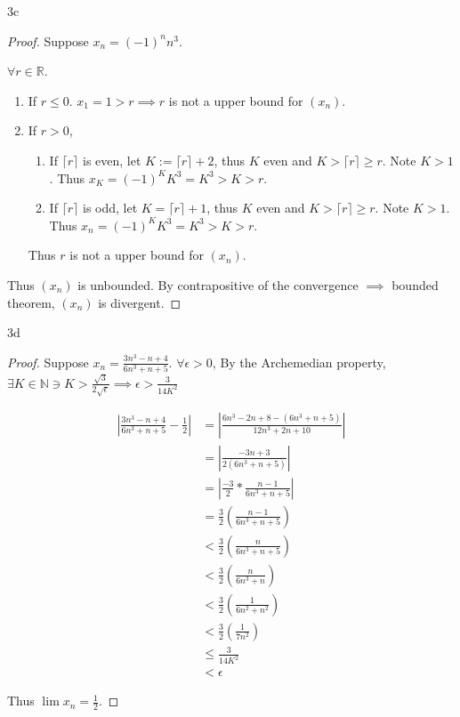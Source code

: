 \documentclass{article}
\newcommand{\R}{\mathbb{R}}
\newcommand{\N}{\mathbb{N}}
\newcommand{\abs}[1]{\left\lvert #1\right\rvert}
\newcommand{\ceil}[1]{\lceil{#1}\rceil}
\begin{document}
\begin{PROB}{3c}\label{Problem 3c.}
\end{PROB}
\begin{proof}
    Suppose $x_n = (-1)^n n^3$. 

    $\forall r \in \R$. 
    
    \begin{enumerate}
        \item If $r \leq 0$. $x_1 = 1 > r \implies r$ is not a upper bound for $(x_n)$.
        \item If $r > 0$, 
        \begin{enumerate}
            \item If $\ceil{r}$ is even, let $K := \ceil{r} + 2$, thus $K$ even and $K > \ceil{r} \geq r$. Note $K > 1$. Thus $x_K = (-1)^K K^3 = K^3 > K > r$.
            \item If $\ceil{r}$ is odd, let $K = \ceil{r} + 1$, thus $K$ even and $K > \ceil{r} \geq r$. Note $K > 1$. Thus $x_n = (-1)^K K^3 = K^3 > K>r$.      
        \end{enumerate}

        Thus $r$ is not a upper bound for $(x_n)$.   
    \end{enumerate}

    Thus $(x_n)$ is unbounded. By contrapositive of the convergence $\implies$ bounded theorem, $(x_n)$ is divergent.
\end{proof}

\begin{PROB}{3d}\label{Problem 3d.}
\end{PROB}
\begin{proof}
    Suppose $x_n = \frac{3n^3 - n + 4}{6n^3 + n + 5}$. $\forall \epsilon > 0$, By the Archemedian property, $\exists K \in \N \ni K > \frac{\sqrt{3}}{2\sqrt{\epsilon}} \implies \epsilon > \frac{3}{14K^2}$     

    
    \begin{align*}
        \abs{\frac{3n^3 - n + 4}{6n^3 + n + 5} - \frac{1}{2}} &= \abs{\frac{6n^3 - 2n + 8 - (6n^3 + n + 5)}{12n^3 + 2n + 10}} \\
        &= \abs{\frac{-3n + 3}{2(6n^3 + n + 5)}} \\
        &= \abs{\frac{-3}{2} * \frac{n - 1}{6n^3 + n + 5}}\\
        &= \frac{3}{2}\left(\frac{n - 1}{6n^3 + n + 5}\right) \\
        &< \frac{3}{2}\left(\frac{n}{6n^3 + n + 5}\right) \\
        &< \frac{3}{2}\left(\frac{n}{6n^3 + n}\right) \\
        &< \frac{3}{2}\left(\frac{1}{6n^2 + n^2}\right) \\
        &< \frac{3}{2}\left(\frac{1}{7n^2}\right) \\
        &\leq \frac{3}{14K^2} \\
        &< \epsilon
    \end{align*}

    Thus $\lim x_n = \frac{1}{2}$. 
\end{proof}
\end{document}
